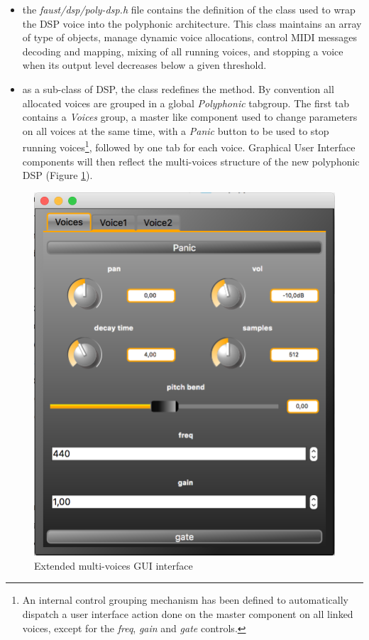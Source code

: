 \begin{itemize}

\item  the {\it faust/dsp/poly-dsp.h} file contains the definition of the  class used to wrap the DSP voice into the polyphonic architecture. This class maintains an array of   type of objects, manage dynamic voice allocations, control MIDI messages decoding and mapping, mixing of all running voices, and stopping a voice when its output level decreases below a given threshold.

\item as a sub-class of DSP, the   class redefines the  method. By convention all allocated voices are grouped in a global  {\it Polyphonic} tabgroup. The first tab contains a {\it Voices} group, a master like component used to change parameters on all voices at the same time, with a {\it Panic} button to be used to stop running voices\footnote{An internal control grouping mechanism has been defined to automatically dispatch a user interface action done on the master component on all linked voices, except for the  {\it freq}, {\it gain} and {\it gate} controls.}, followed by one tab for each voice. Graphical User Interface components will then reflect the multi-voices structure of the new polyphonic DSP (Figure \ref{fig:poly-ui}). 

 \end{itemize}
 
\begin{figure}[!ht]
\begin{center}
\includegraphics[width=0.6\columnwidth]{images/poly_ui}
\caption{\footnotesize Extended multi-voices GUI interface}
\label{fig:poly-ui}
\end{center}
\end{figure}

